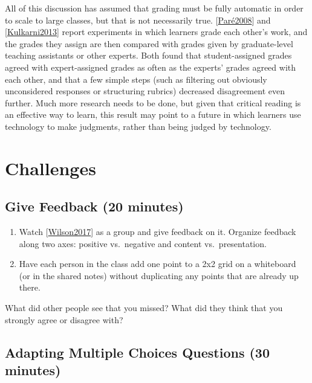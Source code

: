 \documentclass[10pt,statementpaper]{memoir}
\begin{document}
All of this discussion has assumed that grading must be fully automatic
in order to scale to large classes, but that is not necessarily true.
{[}\href{biblio.html\#pare-joordens-peer}{Paré2008}{]} and
{[}\href{biblio.html\#kulkarni-peer-grading}{Kulkarni2013}{]} report
experiments in which learners grade each other's work, and the grades
they assign are then compared with grades given by graduate-level
teaching assistants or other experts. Both found that student-assigned
grades agreed with expert-assigned grades as often as the experts'
grades agreed with each other, and that a few simple steps (such as
filtering out obviously unconsidered responses or structuring rubrics)
decreased disagreement even further. Much more research needs to be
done, but given that critical reading is an effective way to learn, this
result may point to a future in which learners use technology to make
judgments, rather than being judged by technology.

\section{Challenges}\label{challenges-9}

\subsection{Give Feedback (20
minutes)}\label{give-feedback-20-minutes-1}

\begin{enumerate}
\def\labelenumi{\arabic{enumi}.}
\item
  Watch
  {[}\href{biblio.html\#wilson-bad-teaching-recorded}{Wilson2017}{]} as
  a group and give feedback on it. Organize feedback along two axes:
  positive vs.~negative and content vs.~presentation.
\item
  Have each person in the class add one point to a 2x2 grid on a
  whiteboard (or in the shared notes) without duplicating any points
  that are already up there.
\end{enumerate}

What did other people see that you missed? What did they think that you
strongly agree or disagree with?

\subsection{Adapting Multiple Choices Questions (30
minutes)}\label{adapting-multiple-choices-questions-30-minutes}
\end{document}
